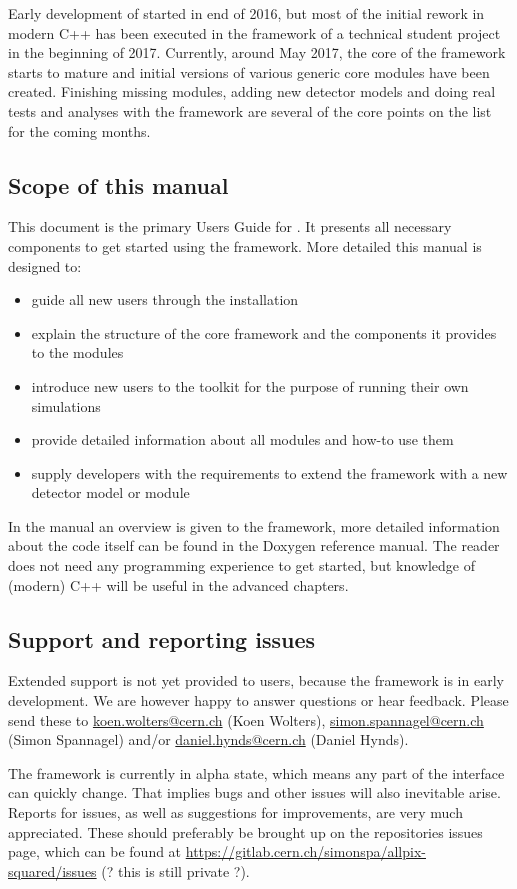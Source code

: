 Early development of \apsq started in end of 2016, but most of the initial rework in modern C++ has been executed in the framework of a technical student project in the beginning of 2017. Currently, around May 2017, the core of the framework starts to mature and initial versions of various generic core modules have been created. Finishing missing modules, adding new detector models and doing real tests and analyses with the framework are several of the core points on the list for the coming months. 

\subsection{Scope of this manual}
This document is the primary Users Guide for \apsq. It presents all necessary components to get started using the framework. More detailed this manual is designed to:
\begin{itemize}
\item guide all new users through the installation 
\item explain the structure of the core framework and the components it provides to the modules
\item introduce new users to the toolkit for the purpose of running their own simulations
\item provide detailed information about all modules and how-to use them
\item supply developers with the requirements to extend the framework with a new detector model or module
\end{itemize}

In the manual an overview is given to the framework, more detailed information about the code itself can be found in the Doxygen reference manual. The reader does not need any programming experience to get started, but knowledge of (modern) C++ will be useful in the advanced chapters.

\subsection{Support and reporting issues}
Extended support is not yet provided to users, because the framework is in early development. We are however happy to answer questions or hear feedback. Please send these to \href{mailto:koen.wolters@cern.ch}{koen.wolters@cern.ch} (Koen Wolters), \href{mailto:simon.spannagel@cern.ch}{simon.spannagel@cern.ch} (Simon Spannagel) and/or \href{mailto:daniel.hynds@cern.ch}{daniel.hynds@cern.ch} (Daniel Hynds).

The \apsq framework is currently in alpha state, which means any part of the interface can quickly change. That implies bugs and other issues will also inevitable arise. Reports for issues, as well as suggestions for improvements, are very much appreciated. These should preferably be brought up on the repositories issues page, which can be found at \url{https://gitlab.cern.ch/simonspa/allpix-squared/issues} (? this is still private ?).
